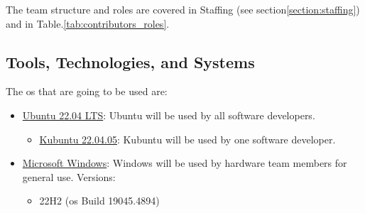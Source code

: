 The team structure and roles are covered in Staffing (see section\:\ref{section:staffing}) and in Table.\:\ref{tab:contributors_roles}.


\begin{comment}
Please note: The roles listed here might have additional responsibilities outlined in the corresponding plans (Documentation Plan, Communication Plan, Testing Plan).

Our team comprises the following roles:

\begin{itemize}
    \item \textbf{Hardware Team Leader:} Manages the hardware development process, coordinates with the software team, and ensures timely delivery while maintaining quality standards.
    \item \textbf{Software Team Leader:} Oversee the software development process, collaborates with the hardware team, and ensure project deadlines are met with high-quality deliverables.
    \item \textbf{Hardware Developer:} Designs, develops, tests, and troubleshoots hardware components and collaborates with the software team.
    \item \textbf{Software Developer:} Develops, tests, and debugs software modules and coordinates with the hardware team.
\end{itemize}
\end{comment}

\subsection{Tools, Technologies, and Systems}
\label{subsection:tools_technologies_and_systems}

The \ac{os} that are going to be used are:
\begin{itemize}
    \item \href{https://releases.ubuntu.com/jammy/}{Ubuntu 22.04 LTS}: Ubuntu will be used by all software developers.
    \begin{itemize}
        \item \href{https://kubuntu.org/getkubuntu/}{Kubuntu 22.04.05}: Kubuntu will be used by one software developer.
    \end{itemize}
    \item \href{https://www.microsoft.com/en-us/download/windows}{Microsoft Windows}: Windows will be used by hardware team members for general use. Versions:
    \begin{itemize}
        \item 22H2 (\ac{os} Build 19045.4894)
    \end{itemize}
\end{itemize}

